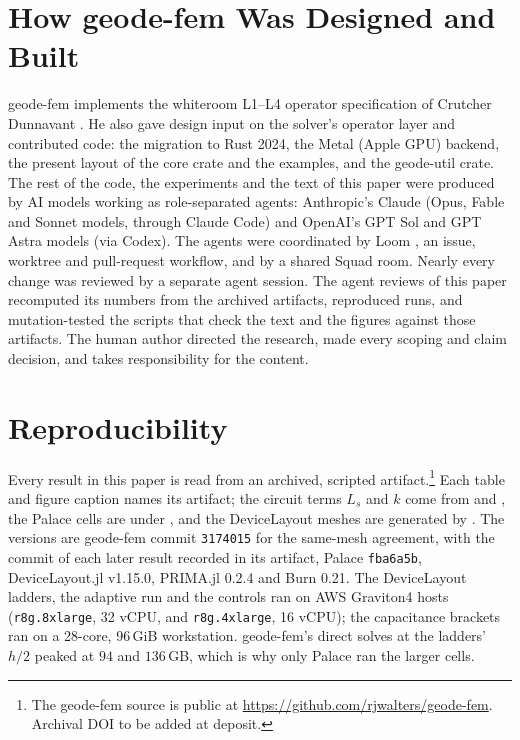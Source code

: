 \documentclass{anvil-paper}
\begin{document}
\section{How geode-fem Was Designed and Built}
\label{sec:built}

geode-fem implements the whiteroom L1--L4 operator specification of
Crutcher Dunnavant \citep{dunnavant2026whiteroom}. He also gave design
input on the solver's operator layer and contributed code: the migration to
Rust 2024, the Metal (Apple GPU) backend, the present layout of the core
crate and the examples, and the geode-util crate. The rest of the code, the
experiments and the text of this paper were produced by AI models
working as role-separated agents: Anthropic's Claude (Opus, Fable and
Sonnet models, through Claude Code) and OpenAI's GPT Sol and GPT Astra
models (via Codex). The agents were coordinated by Loom \citep{loom}, an
issue, worktree and pull-request workflow, and by a shared Squad room.
Nearly every change was reviewed by a separate agent session. The agent
reviews of this paper recomputed its numbers from the archived artifacts,
reproduced runs, and mutation-tested the scripts that check the text and
the figures against those artifacts. The human author directed the
research, made every scoping and claim decision, and takes responsibility
for the content.

\section{Reproducibility}
\label{sec:repro}

Every result in this paper is read from an archived, scripted
artifact.\footnote{The geode-fem source is public at
\url{https://github.com/rjwalters/geode-fem}. Archival DOI to be added at
deposit.}
Each table and figure caption names its artifact; the circuit terms $L_s$
and $k$ come from  and
, the Palace cells are under
, and the DeviceLayout meshes are
generated by . The versions are geode-fem commit
\texttt{3174015} for the same-mesh agreement, with the commit of each later
result recorded in its artifact, Palace \texttt{fba6a5b}, DeviceLayout.jl
v1.15.0, PRIMA.jl 0.2.4 and Burn 0.21. The DeviceLayout ladders, the
adaptive run and the controls ran on AWS Graviton4 hosts
(\texttt{r8g.8xlarge}, 32 vCPU, and \texttt{r8g.4xlarge}, 16 vCPU); the
capacitance brackets ran on a 28-core, 96\,GiB workstation. geode-fem's
direct solves at the ladders' $h/2$ peaked at $94$ and $136$\,GB, which is
why only Palace ran the larger cells.
\end{document}
